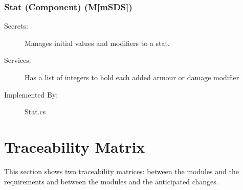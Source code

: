 \documentclass[12pt, titlepage]{article}
\newcommand{\mref}[1]{M\ref{#1}}
\begin{document}
\subsubsection{Stat (Component) (\mref{mSDS})}

\begin{description}
\item[Secrets:] Manages initial values and modifiers to a stat.
\item[Services:] Has a list of integers to hold each added armour or damage modifier
\item[Implemented By:] Stat.cs
\end{description}

\newpage
\section{Traceability Matrix} \label{SecTM}

This section shows two traceability matrices: between the modules and the
requirements and between the modules and the anticipated changes.
\end{document}
